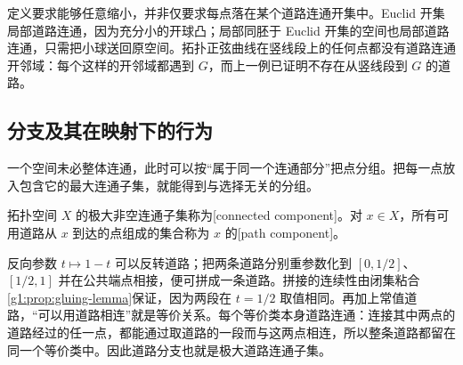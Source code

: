 定义要求能够任意缩小，并非仅要求每点落在某个道路连通开集中。Euclid 开集局部道路连通，因为充分小的开球凸；局部同胚于 Euclid 开集的空间也局部道路连通，只需把小球送回原空间。拓扑正弦曲线在竖线段上的任何点都没有道路连通开邻域：每个这样的开邻域都遇到 \(G\)，而上一例已证明不存在从竖线段到 \(G\) 的道路。

\subsection{分支及其在映射下的行为}
\label{g1:subsec:0402:04}

一个空间未必整体连通，此时可以按“属于同一个连通部分”把点分组。把每一点放入包含它的最大连通子集，就能得到与选择无关的分组。

\begin{definition}\label{g1:def:components}
	拓扑空间 \(X\) 的极大非空连通子集称为[connected component]。对 \(x\in X\)，所有可用道路从 \(x\) 到达的点组成的集合称为 \(x\) 的[path component]。
\end{definition}

反向参数 \(t\mapsto1-t\) 可以反转道路；把两条道路分别重参数化到 \([0,1/2]\)、\([1/2,1]\) 并在公共端点相接，便可拼成一条道路。拼接的连续性由闭集粘合\cref{g1:prop:gluing-lemma}保证，因为两段在 \(t=1/2\) 取值相同。再加上常值道路，“可以用道路相连”就是等价关系。每个等价类本身道路连通：连接其中两点的道路经过的任一点，都能通过取道路的一段而与这两点相连，所以整条道路都留在同一个等价类中。因此道路分支也就是极大道路连通子集。


